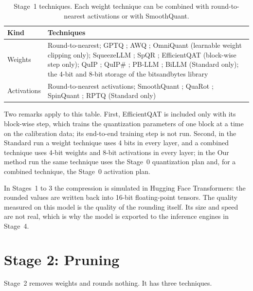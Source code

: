 \documentclass[
11pt, %
english, %
singlespacing, %
headsepline, %
]{MastersDoctoralThesis} %
\begin{document}
\begin{table}[htbp]
\centering
\small
\caption{Stage~1 techniques. Each weight technique can be combined with round-to-nearest activations or with SmoothQuant.}
\label{tab:ch4-stage1}
\renewcommand{\arraystretch}{1.2}
\begin{tabularx}{\textwidth}{lX}
\hline
\textbf{Kind} & \textbf{Techniques} \\
\hline
Weights & Round-to-nearest; GPTQ \cite{frantar2023gptq}; AWQ \cite{lin2024awq}; OmniQuant \cite{shao2024omniquant} (learnable weight clipping only); SqueezeLLM \cite{kim2024squeezellm}; SpQR \cite{dettmers2024spqr}; EfficientQAT \cite{chen2025efficientqat} (block-wise step only); QuIP \cite{chee2023quip}; QuIP\# \cite{tseng2024quipsharp}; PB-LLM \cite{shang2023pbllm}; BiLLM \cite{huang2024billm} (Standard only); the 4-bit and 8-bit storage of the bitsandbytes library \\
Activations & Round-to-nearest activations; SmoothQuant \cite{xiao2023smoothquant}; QuaRot \cite{ashkboos2024quarot}; SpinQuant \cite{liu2025spinquant}; RPTQ \cite{yuan2023rptq} (Standard only) \\
\hline
\end{tabularx}
\end{table}

Two remarks apply to this table. First, EfficientQAT is included only with its block-wise step, which trains the quantization parameters of one block at a time on the calibration data; its end-to-end training step is not run. Second, in the Standard run a weight technique uses 4 bits in every layer, and a combined technique uses 4-bit weights and 8-bit activations in every layer; in the Our method run the same technique uses the Stage~0 quantization plan and, for a combined technique, the Stage~0 activation plan.

In Stages~1 to 3 the compression is simulated in Hugging Face Transformers: the rounded values are written back into 16-bit floating-point tensors. The quality measured on this model is the quality of the rounding itself. Its size and speed are not real, which is why the model is exported to the inference engines in Stage~4.

\section{Stage 2: Pruning}
\label{sec:ch4-stage2}

Stage~2 removes weights and rounds nothing. It has three techniques.
\end{document}
